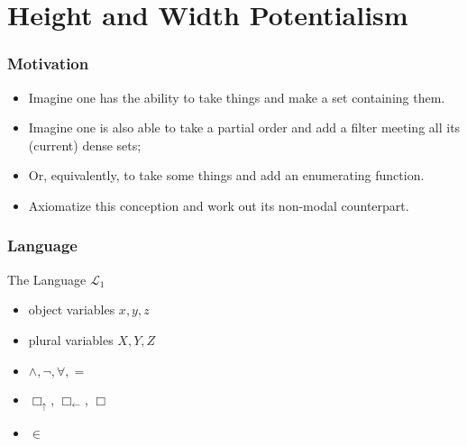 \documentclass{beamer}
\newcommand{\bu}{\Box_\uparrow}
\newcommand{\bl}{\Box_\leftarrow}
\begin{document}
\section{Height and Width Potentialism}
\begin{frame}
    \frametitle{Motivation}
    \begin{itemize}
        \item<2->   Imagine one has the ability to take things and 
                    make a set containing them.
        \item<3->   Imagine one is also able to take a partial order and add a filter 
                    meeting all its (current) dense sets; 
        \item<4->   Or, equivalently, to take some things and add an enumerating function.
        \item<5->   Axiomatize this conception and work out its non-modal counterpart.
    \end{itemize}
\end{frame}
\begin{frame}
    \frametitle{Language}
    \begin{block}{The Language $\mathcal{L}_1$}
        \begin{itemize}
            \item object variables $x, y, z$
            \item<2-> plural variables $X, Y, Z$
            \item<3-> $\wedge, \neg, \forall, =$
            \item<4-> $\bu$, $\bl$, $\Box$
            \item<5-> $\in$
        \end{itemize} 
    \end{block}
\end{frame}
\end{document}
